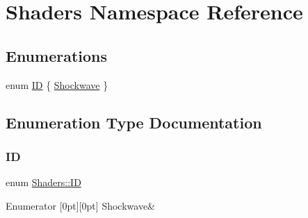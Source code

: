 \hypertarget{namespace_shaders}{}\section{Shaders Namespace Reference}
\label{namespace_shaders}
\subsection*{Enumerations}
\begin{DoxyCompactItemize}
\item 
enum \hyperlink{namespace_shaders_ac69c86b4e324fdda75990b34e9a1dc7e}{ID} \{ \hyperlink{namespace_shaders_ac69c86b4e324fdda75990b34e9a1dc7eaf02a64b9b6206367e82aae811cd52d1b}{Shockwave}
 \}
\end{DoxyCompactItemize}


\subsection{Enumeration Type Documentation}
\hypertarget{namespace_shaders_ac69c86b4e324fdda75990b34e9a1dc7e}{}\label{namespace_shaders_ac69c86b4e324fdda75990b34e9a1dc7e} 
\subsubsection{\texorpdfstring{ID}{ID}}
{\footnotesize\ttfamily enum \hyperlink{namespace_shaders_ac69c86b4e324fdda75990b34e9a1dc7e}{Shaders\+::\+ID}}

\begin{DoxyEnumFields}{Enumerator}
[0pt][0pt]{}\hypertarget{namespace_shaders_ac69c86b4e324fdda75990b34e9a1dc7eaf02a64b9b6206367e82aae811cd52d1b}{}\label{namespace_shaders_ac69c86b4e324fdda75990b34e9a1dc7eaf02a64b9b6206367e82aae811cd52d1b} 
Shockwave&\\
\hline

\end{DoxyEnumFields}
